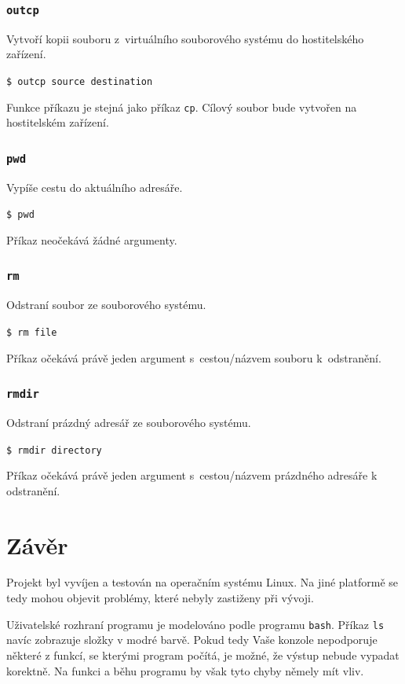 \documentclass[12pt]{article}
\begin{document}
\subsubsection{\texttt{outcp}}\label{sec:outcp}

Vytvoří kopii souboru z~virtuálního souborového systému do hostitelského zařízení.

\texttt{\$ outcp source destination}

Funkce příkazu je stejná jako příkaz \texttt{cp}.
Cílový soubor bude vytvořen na hostitelském zařízení.

\subsubsection{\texttt{pwd}}\label{sec:pwd}

Vypíše cestu do aktuálního adresáře.

\texttt{\$ pwd}

Příkaz neočekává žádné argumenty.

\subsubsection{\texttt{rm}}\label{sec:rm}

Odstraní soubor ze souborového systému.

\texttt{\$ rm file}

Příkaz očekává právě jeden argument s~cestou/názvem souboru k~odstranění.

\subsubsection{\texttt{rmdir}}\label{sec:rmdir}

Odstraní prázdný adresář ze souborového systému.

\texttt{\$ rmdir directory}

Příkaz očekává právě jeden argument s~cestou/názvem prázdného adresáře k odstranění.

\section{Závěr}

Projekt byl vyvíjen a testován na operačním systému Linux.
Na jiné platformě se tedy mohou objevit problémy, které nebyly zastiženy při vývoji.

Uživatelské rozhraní programu je modelováno podle programu \texttt{bash}.
Příkaz \texttt{ls} navíc zobrazuje složky v modré barvě.
Pokud tedy Vaše konzole nepodporuje některé z funkcí, se kterými program počítá, je možné, že výstup nebude vypadat korektně.
Na funkci a běhu programu by však tyto chyby němely mít vliv.
\end{document}
